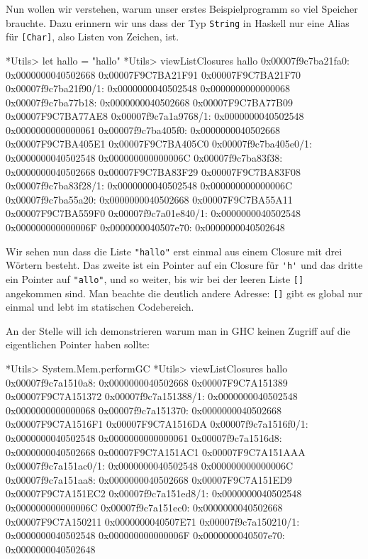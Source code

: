 \documentclass[11pt,DIV=12,parskip=half,headings=normal,abstract]{scrartcl}
\newcommand{\li}{\lstinline[style=haskell]}
\begin{document}
Nun wollen wir verstehen, warum unser erstes Beispielprogramm so viel Speicher brauchte. Dazu erinnern wir uns dass der Typ \li-String- in Haskell nur eine Alias für \li-[Char]-, also Listen von Zeichen, ist.
\begin{ghci}
*Utils> let hallo = "hallo"
*Utils> viewListClosures hallo
0x00007f9c7ba21fa0: 0x0000000040502668 0x00007F9C7BA21F91 0x00007F9C7BA21F70
0x00007f9c7ba21f90/1: 0x0000000040502548 0x0000000000000068
0x00007f9c7ba77b18: 0x0000000040502668 0x00007F9C7BA77B09 0x00007F9C7BA77AE8
0x00007f9c7a1a9768/1: 0x0000000040502548 0x0000000000000061
0x00007f9c7ba405f0: 0x0000000040502668 0x00007F9C7BA405E1 0x00007F9C7BA405C0
0x00007f9c7ba405e0/1: 0x0000000040502548 0x000000000000006C
0x00007f9c7ba83f38: 0x0000000040502668 0x00007F9C7BA83F29 0x00007F9C7BA83F08
0x00007f9c7ba83f28/1: 0x0000000040502548 0x000000000000006C
0x00007f9c7ba55a20: 0x0000000040502668 0x00007F9C7BA55A11 0x00007F9C7BA559F0
0x00007f9c7a01e840/1: 0x0000000040502548 0x000000000000006F
0x0000000040507e70: 0x0000000040502648
\end{ghci}
Wir sehen nun dass die Liste \li-"hallo"- erst einmal aus einem Closure mit drei Wörtern besteht. Das zweite ist ein Pointer auf ein Closure für \li-'h'- und das dritte ein Pointer auf \li-"allo"-, und so weiter, bis wir bei der leeren Liste \li-[]- angekommen sind. Man beachte die deutlich andere Adresse: \li-[]- gibt es global nur einmal und lebt im statischen Codebereich.

An der Stelle will ich demonstrieren warum man in GHC keinen Zugriff auf die eigentlichen Pointer haben sollte:
\begin{ghci}
*Utils> System.Mem.performGC
*Utils> viewListClosures hallo
0x00007f9c7a1510a8: 0x0000000040502668 0x00007F9C7A151389 0x00007F9C7A151372
0x00007f9c7a151388/1: 0x0000000040502548 0x0000000000000068
0x00007f9c7a151370: 0x0000000040502668 0x00007F9C7A1516F1 0x00007F9C7A1516DA
0x00007f9c7a1516f0/1: 0x0000000040502548 0x0000000000000061
0x00007f9c7a1516d8: 0x0000000040502668 0x00007F9C7A151AC1 0x00007F9C7A151AAA
0x00007f9c7a151ac0/1: 0x0000000040502548 0x000000000000006C
0x00007f9c7a151aa8: 0x0000000040502668 0x00007F9C7A151ED9 0x00007F9C7A151EC2
0x00007f9c7a151ed8/1: 0x0000000040502548 0x000000000000006C
0x00007f9c7a151ec0: 0x0000000040502668 0x00007F9C7A150211 0x0000000040507E71
0x00007f9c7a150210/1: 0x0000000040502548 0x000000000000006F
0x0000000040507e70: 0x0000000040502648
\end{ghci}
\end{document}

